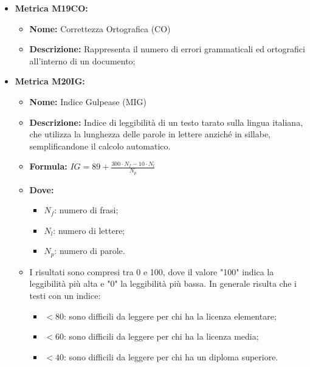 \begin{itemize}
    \item \textbf{Metrica M19CO:}
          \begin{itemize}
              \item \textbf{Nome:} Correttezza Ortografica (CO)
              \item \textbf{Descrizione:} Rappresenta il numero di errori grammaticali ed
              ortografici all'interno di un documento;
          \end{itemize}

            \item \textbf{Metrica M20IG:}
            \begin{itemize}
                \item \textbf{Nome:} Indice Gulpease (MIG)
                \item \textbf{Descrizione:} Indice di leggibilità di un testo tarato sulla lingua italiana, che utilizza la lunghezza delle parole in lettere anziché in sillabe, semplificandone il calcolo automatico.
                \item \textbf{Formula:} $IG = 89 + \frac{300 \cdot N_f - 10 \cdot N_l}{N_p}$
                \item \textbf{Dove:}
                      \begin{itemize}
                          \item $N_f$: numero di frasi;
                          \item $N_l$: numero di lettere;
                          \item $N_p$: numero di parole.
                      \end{itemize}
                \item I risultati sono compresi tra 0 e 100, dove il valore "100" indica la leggibilità più alta e "0" la leggibilità più bassa. In generale risulta che i testi con un indice:
                      \begin{itemize}
                          \item $< 80$: sono difficili da leggere per chi ha la licenza elementare;
                          \item $< 60$: sono difficili da leggere per chi ha la licenza media;
                          \item $< 40$: sono difficili da leggere per chi ha un diploma superiore.
                      \end{itemize}
            \end{itemize}


\end{itemize}
